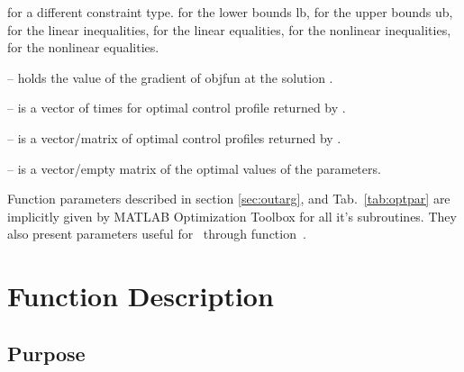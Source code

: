 \begin{description}
  for a different constraint type.  for the lower
  bounds lb,  for the upper bounds ub,
   for the linear inequalities,
   for the linear equalities,
   for the nonlinear inequalities,
   for the nonlinear equalities.
\item[\argfun{grad}] -- holds the value of the gradient of objfun at
  the solution .   
\item[\argfun{t}] -- is a vector of times for optimal control profile
  returned by .
\item[\argfun{u}] -- is a vector/matrix of optimal control profiles
  returned by .
\item[\argfun{p}] -- is a vector/empty matrix of the optimal values of
  the parameters. 
\end{description}

Function parameters described in section \ref{sec:outarg}, and
Tab.~\ref{tab:optpar} are implicitly given by MATLAB Optimization
Toolbox for all it's subroutines. They also present parameters useful
for~ through function~. 

\section{Function Description}
\label{sec:fundes}

\subsection{Purpose} 
\label{sec:fundespur}

